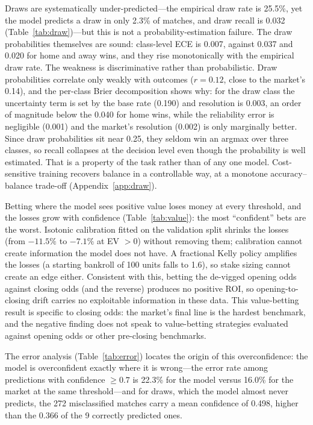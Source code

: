 \documentclass[10pt]{article}
\begin{document}
Draws are systematically under-predicted---the empirical draw rate is
25.5\%, yet the model predicts a draw in only 2.3\% of matches, and draw recall
is 0.032 (Table~\ref{tab:draw})---but this is not a probability-estimation
failure. The draw probabilities themselves are sound: class-level ECE is 0.007, against
0.037 and 0.020 for home and away wins, and they rise monotonically with the
empirical draw rate. The weakness is discriminative rather than probabilistic.
Draw probabilities correlate only weakly with outcomes ($r = 0.12$, close to the
market's 0.14), and the per-class Brier decomposition shows why: for the draw
class the uncertainty term is set by the base rate (0.190) and resolution is
0.003, an order of magnitude below the 0.040 for home wins, while the reliability
error is negligible (0.001) and the market's resolution (0.002) is only
marginally better. Since draw probabilities sit near 0.25, they seldom win an
argmax over three classes, so recall collapses at the decision level even though
the probability is well estimated. That is a property of the task rather than of
any one model. Cost-sensitive training recovers balance in a
controllable way, at a monotone accuracy--balance trade-off
(Appendix~\ref{app:draw}).

Betting where the model sees positive value loses money at every
threshold, and the losses grow with confidence (Table~\ref{tab:value}): the
most ``confident'' bets are the worst. Isotonic calibration fitted on the validation split shrinks the
losses (from $-11.5\%$ to $-7.1\%$ at EV $>0$) without removing them; calibration
cannot create information the model does not have. A
fractional Kelly policy amplifies the losses (a starting bankroll of 100 units
falls to 1.6), so stake sizing cannot create an edge either. Consistent with
this, betting the de-vigged opening odds against closing
odds (and the reverse) produces no positive ROI, so
opening-to-closing drift carries no exploitable information in these data.
This value-betting result is specific to closing odds: the market's final line
is the hardest benchmark, and the negative finding does not speak to
value-betting strategies evaluated against opening odds or other pre-closing
benchmarks.

The error analysis (Table~\ref{tab:error}) locates the origin of this
overconfidence: the model is overconfident exactly where it is wrong---the
error rate among predictions with confidence $\ge 0.7$ is 22.3\% for the model
versus 16.0\% for the market at the same threshold---and for draws, which the
model almost never predicts, the 272 misclassified matches carry a mean
confidence of 0.498, higher than the 0.366 of the 9 correctly predicted ones.
\end{document}
